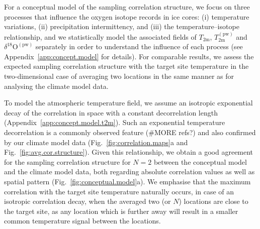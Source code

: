 \documentclass[cp, manuscript, draft]{copernicus}
\begin{document}
For a conceptual model of the sampling correlation structure, we focus on three
processes that influence the oxygen isotope records in ice cores: (i)
temperature variations, (ii) precipitation intermittency, and (iii) the
temperature--isotope relationship, and we statistically model the associated
fields of $T_{\mathrm{2m}}$, $T_{2\mathrm{m}}^{\mathrm{(pw)}}$ and
$\delta^{18}\mathrm{O}^{\mathrm{(pw)}}$ separately in order to understand the
influence of each process (see Appendix~\ref{app:concept.model} for details).
For comparable results, we assess the expected sampling correlation structure
with the target site temperature in the two-dimensional case of averaging two
locations in the same manner as for analysing the climate model data.

To model the atmospheric temperature field, we assume an isotropic exponential
decay of the correlation in space with a constant decorrelation length
(Appendix~\ref{app:concept.model.t2m}). Such an exponential temperature
decorrelation is a commonly observed feature \citep{Jones1997} (\#MORE refs?)
and also confirmed by our climate model data (Fig.~\ref{fig:correlation.maps}a
and Fig.~\ref{fig:avg.cor.structure}). Given this relationship, we obtain a good
agreement for the sampling correlation structure for $N=2$ between the
conceptual model and the climate model data, both regarding absolute correlation
values as well as spatial pattern (Fig.~\ref{fig:conceptual.model}a). We
emphasise that the maximum correlation with the target site temperature
naturally occurs, in case of an isotropic correlation decay, when the averaged
two (or $N$) locations are close to the target site, as any location which is
further away will result in a smaller common temperature signal between the
locations.
\end{document}
